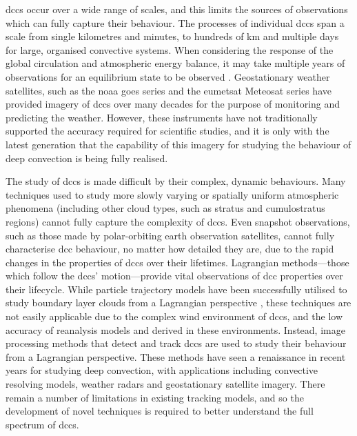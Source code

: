 \acrshort{dcc}s occur over a wide range of scales, and this limits the sources of observations which can fully capture their behaviour.
The processes of individual \acrshort{dcc}s span a scale from single kilometres and minutes, to hundreds of km and multiple days for large, organised convective systems.
When considering the response of the global circulation and atmospheric energy balance, it may take multiple years of observations for an equilibrium state to be observed \citep{muller_energetic_2011}.
Geostationary weather satellites, such as the \acrfull{noaa} \acrfull{goes} series and the \acrfull{eumetsat} Meteosat series have provided imagery of \acrshort{dcc}s over many decades for the purpose of monitoring and predicting the weather.
However, these instruments have not traditionally supported the accuracy required for scientific studies, and it is only with the latest generation that the capability of this imagery for studying the behaviour of deep convection is being fully realised.

The study of \acrshort{dcc}s is made difficult by their complex, dynamic behaviours.
Many techniques used to study more slowly varying or spatially uniform atmospheric phenomena (including other cloud types, such as stratus and cumulostratus regions) cannot fully capture the complexity of \acrshort{dcc}s.
Even snapshot observations, such as those made by polar-orbiting earth observation satellites, cannot fully characterise \acrshort{dcc} behaviour, no matter how detailed they are, due to the rapid changes in the properties of \acrshort{dcc}s over their lifetimes.
Lagrangian methods---those which follow the \acrshort{dcc}s' motion---provide vital observations of \acrshort{dcc} properties over their lifecycle.
While particle trajectory models have been successfully utilised to study boundary layer clouds from a Lagrangian perspective \citep[e.g][]{eastman_competing_2018, christensen_aerosols_2020a}, these techniques are not easily applicable due to the complex wind environment of \acrshort{dcc}s, and the low accuracy of reanalysis models and derived  in these environments.
Instead, image processing methods that detect and track \acrshort{dcc}s are used to study their behaviour from a Lagrangian perspective.
These methods have seen a renaissance in recent years for studying deep convection, with applications including convective resolving models, weather radars and geostationary satellite imagery.
There remain a number of limitations in existing tracking models, and so the development of novel techniques is required to better understand the full spectrum of \acrshort{dcc}s.

